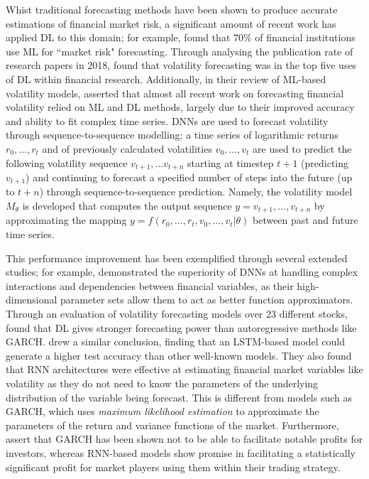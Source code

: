 \documentclass[a4paper, 11pt]{report}
\begin{document}
    Whist traditional forecasting methods have been shown to produce accurate estimations of financial market risk, a significant amount of recent work has applied DL to this domain; for example, \citet{chartis-2019} found that $70\%$ of financial institutions use ML for ``market risk" forecasting. Through analysing the publication rate of research papers in 2018, \citet{sezer-2019} found that volatility forecasting was in the top five uses of DL within financial research. Additionally, in their review of ML-based volatility models, \citet{ge-2022} asserted that almost all recent work on forecasting financial volatility relied on ML and DL methods, largely due to their improved accuracy and ability to fit complex time series. DNNs are used to forecast volatility through sequence-to-sequence modelling; a time series of logarithmic returns $r_0, \dots, r_t$ and of previously calculated volatilities $v_0, \dots, v_t$ are used to predict the following volatility sequence $v_{t+1}, \ldots v_{t+n}$ starting at timestep $t+1$ (predicting $v_{t+1}$) and continuing to forecast a specified number of steps into the future (up to $t+n$) through sequence-to-sequence prediction. Namely, the volatility model $M_{\theta}$ is developed that computes the output sequence $y = v_{t+1}, \dots, v_{t+n}$ by approximating the mapping $y = f( r_0, \dots, r_t, v_0, \dots, v_t \lvert \theta )$ between past and future time series.
    
    This performance improvement has been exemplified through several extended studies; for example, \citet{zhang-2022} demonstrated the superiority of DNNs at handling complex interactions and dependencies between financial variables, as their high-dimensional parameter sets allow them to act as better function approximators. Through an evaluation of volatility forecasting models over 23 different stocks, \citet{rahimikia-2020} found that DL gives stronger forecasting power than autoregressive methods like GARCH. \citet{rodikov-2022} drew a similar conclusion, finding that an LSTM-based model could generate a higher test accuracy than other well-known models. They also found that RNN architectures were effective at estimating financial market variables like volatility as they do not need to know the parameters of the underlying distribution of the variable being forecast. This is different from models such as GARCH, which uses \emph{maximum likelihood estimation} to approximate the parameters of the return and variance functions of the market. Furthermore, \citet{tino-2001} assert that GARCH has been shown not to be able to facilitate notable profits for investors, whereas RNN-based models show promise in facilitating a statistically significant profit for market players using them within their trading strategy. 
\end{document}
